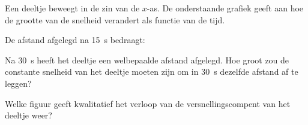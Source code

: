 \documentclass{ximera}
\begin{document}
\begin{exercise}
Een deeltje beweegt in de zin van de $x$-as. De onderstaande grafiek geeft aan hoe de grootte van de snelheid verandert als functie van de tijd.
\begin{image}
    \end{image}



\begin{question}
De afstand afgelegd na \SI{15}{s} bedraagt:
\end{question}
\begin{question}
Na \SI{30}{s} heeft het deeltje een welbepaalde afstand afgelegd. Hoe groot zou de constante snelheid van het deeltje moeten zijn om in \SI{30}{s} dezelfde afstand af te leggen?

\end{question}
\begin{question}
Welke figuur geeft kwalitatief het verloop van de versnellingscompent van het deeltje weer?

\begin{image}
\end{image}
\end{question}
\end{exercise}
\end{document}
